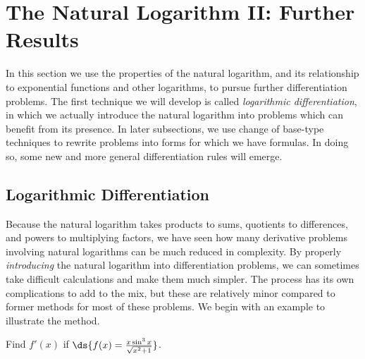 \section{The Natural Logarithm II: Further Results}
In this section we use the properties of the natural logarithm,
and its relationship to exponential functions and other 
logarithms, to pursue further differentiation problems.
The first technique we will develop is called
{\it logarithmic differentiation}, in which we 
actually introduce the natural logarithm into
problems which can benefit from its presence.  In later
subsections, we use change of base-type techniques to
rewrite problems into forms for which we have formulas.
In doing so, some new and more general differentiation
rules will emerge.


\subsection{Logarithmic Differentiation}
Because the natural logarithm takes products to sums, quotients to 
differences, and powers to multiplying factors, we have seen
how many derivative problems involving natural logarithms can
be much reduced in complexity.  By properly {\it introducing} the natural
logarithm into differentiation problems, we can 
sometimes take difficult calculations and make them much
simpler.  The process has its own complications to add to the
mix, but these are relatively minor compared to 
former methods for most of these problems.
We begin with an example to illustrate the method.

\bex Find $f'(x)$ if $\ds{f(x)=\frac{x\sin^3 x}{\sqrt{x^2+1}}}$.

